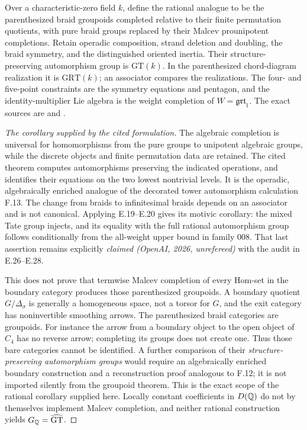 Over a characteristic-zero field $k$, define the rational analogue to be the parenthesized braid groupoids completed relative to their finite permutation quotients, with pure braid groups replaced by their Malcev prounipotent completions. Retain operadic composition, strand deletion and doubling, the braid symmetry, and the distinguished oriented inertia. Their structure-preserving automorphism group is $\mathrm{GT}(k)$. In the parenthesized chord-diagram realization it is $\mathrm{GRT}(k)$; an associator compares the realizations. The four- and five-point constraints are the symmetry equations and pentagon, and the identity-multiplier Lie algebra is the weight completion of $W=\mathfrak{grt}_1$. The exact sources are \citet[\S\S5--6, Propositions 5.1 and 5.5]{Drinfeld1990} and \citet[Proposition 3.4, Theorems 1--3, Corollary 4.1]{BarNatan1998}.
\begin{proof}[The corollary supplied by the cited formulation]
The algebraic completion is universal for homomorphisms from the pure groups to unipotent algebraic groups, while the discrete objects and finite permutation data are retained. The cited theorem computes automorphisms preserving the indicated operations, and identifies their equations on the two lowest nontrivial levels. It is the operadic, algebraically enriched analogue of the decorated tower automorphism calculation F.13. The change from braids to infinitesimal braids depends on an associator and is not canonical. Applying E.19--E.20 gives its motivic corollary: the mixed Tate group injects, and its equality with the full rational automorphism group follows conditionally from the all-weight upper bound in family 008. That last assertion remains explicitly \emph{claimed (OpenAI, 2026, unrefereed)} with the audit in E.26--E.28.

This does not prove that termwise Malcev completion of every Hom-set in the boundary category produces those parenthesized groupoids. A boundary quotient $G/\Delta_\sigma$ is generally a homogeneous space, not a torsor for $G$, and the exit category has noninvertible smoothing arrows. The parenthesized braid categories are groupoids. For instance the arrow from a boundary object to the open object of $C_4$ has no reverse arrow; completing its groups does not create one. Thus those bare categories cannot be identified. A further comparison of their \emph{structure-preserving automorphism groups} would require an algebraically enriched boundary construction and a reconstruction proof analogous to F.12; it is not imported silently from the groupoid theorem. This is the exact scope of the rational corollary supplied here. Locally constant coefficients in $D(\mathbb Q)$ do not by themselves implement Malcev completion, and neither rational construction yields $G_{\mathbb Q}=\widehat{\mathrm{GT}}$.
\end{proof}

